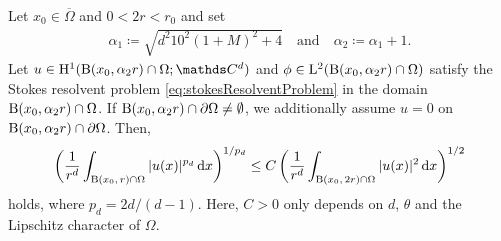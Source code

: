\begin{lem}
  \label{lem:reverseHoelder}
  Let $x_0 \in \overline\Omega$ and $0 < 2r < r_0$ and set 
  \begin{align*}
    \alpha_1 \coloneqq \sqrt{d^2 10^2 (1 + M)^2 + 4} \quad\text{and}\quad \alpha_2 \coloneqq \alpha_1 + 1.
  \end{align*}
  Let $u \in \HH^1(\BB(x_0, \alpha_2 r) \cap \Omega; \C^d)$ and $\phi \in \mathrm{L}^2(\mathrm{B}(x_0, \alpha_2 r) \cap \Omega)$ satisfy the Stokes resolvent problem \eqref{eq:stokesResolventProblem} in the domain $\mathrm{B}(x_0, \alpha_2 r) \cap \Omega$. 
  If $\mathrm{B}(x_0, \alpha_2 r) \cap \partial \Omega \neq \emptyset $, we additionally assume $u = 0$ on $\mathrm{B}(x_0, \alpha_2 r) \cap \partial\Omega$.
  Then,
  \begin{align}
    \label{eq:reverseHoelder}
    \bigg( \frac{1}{r^{d}} \int_{\mathrm{B}(x_0,\, r) \cap \Omega} |u(x)|^{p_d} \, {\operatorname{d}\!{x}}\bigg)^{1/{p_d}} 
    \leq C \, \bigg( \frac{1}{r^{d}} \int_{\mathrm{B}(x_0,\, 2 r) \cap \Omega} |u(x)|^2 \, {\operatorname{d}\!{x}} \bigg)^{1/2}
  \end{align}
  holds, where $p_d = 2d / (d - 1)$.
  Here, $C > 0$ only depends on $d$, $\theta$ and the Lipschitz character of $\Omega$.
\end{lem}

